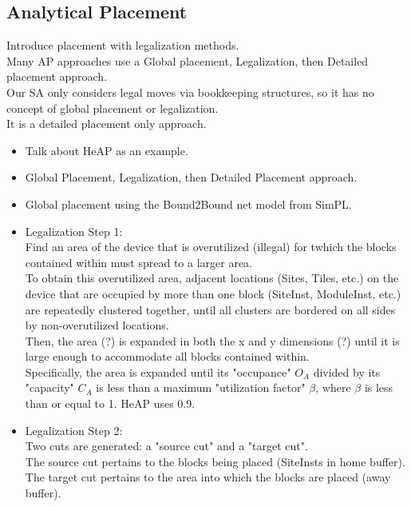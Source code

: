 \documentclass{article}
\begin{document}
\begin{multicols}{2}
\section{Analytical Placement}
    Introduce placement with legalization methods. \\
    Many AP approaches use a Global placement, Legalization, then Detailed placement approach. \\
    Our SA only considers legal moves via bookkeeping structures, so it has no concept of global placement or legalization. \\
    It is a detailed placement only approach. \\
    \begin{itemize}
        \item Talk about HeAP as an example.
        \item Global Placement, Legalization, then Detailed Placement approach.
        \item Global placement using the Bound2Bound net model from SimPL.
        \item Legalization Step 1: \\
            Find an area of the device that is overutilized (illegal) for twhich the blocks contained within must spread to a larger area. \\
            To obtain this overutilized area, adjacent locations (Sites, Tiles, etc.) on the device that are occupied by more than one block (SiteInst, ModuleInst, etc.) are repeatedly clustered together, until all clusters are bordered on all sides by non-overutilized locations. \\ 
            Then, the area (?) is expanded in both the x and y dimensions (?) until it is large enough to accommodate all blocks contained within. \\
            Specifically, the area is expanded until its "occupance" \(O_A\) divided by its "capacity" \(C_A\) is less than a maximum "utilization factor" $\beta$, where $\beta$ is less than or equal to 1. HeAP uses 0.9.
        \item Legalization Step 2: \\
            Two cuts are generated: a "source cut" and a "target cut". \\
            The source cut pertains to the blocks being placed (SiteInsts in home buffer). \\ 
            The target cut pertains to the area into which the blocks are placed (away buffer). \\

\end{itemize}
\end{multicols}
\end{document}

